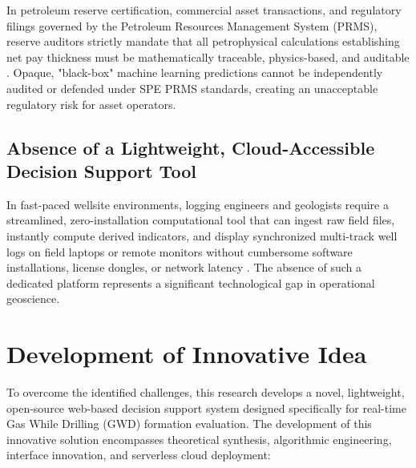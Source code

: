 In petroleum reserve certification, commercial asset transactions, and regulatory filings governed by the \citet{ref3} Petroleum Resources Management System (PRMS), reserve auditors strictly mandate that all petrophysical calculations establishing net pay thickness must be mathematically traceable, physics-based, and auditable \citep{ref2, ref3}. Opaque, "black-box" machine learning predictions cannot be independently audited or defended under SPE PRMS standards, creating an unacceptable regulatory risk for asset operators.

\subsection{Absence of a Lightweight, Cloud-Accessible Decision Support Tool}
In fast-paced wellsite environments, logging engineers and geologists require a streamlined, zero-installation computational tool that can ingest raw field files, instantly compute derived indicators, and display synchronized multi-track well logs on field laptops or remote monitors without cumbersome software installations, license dongles, or network latency \citep{wood2020}. The absence of such a dedicated platform represents a significant technological gap in operational geoscience.

\section{Development of Innovative Idea}

To overcome the identified challenges, this research develops a novel, lightweight, open-source web-based decision support system designed specifically for real-time Gas While Drilling (GWD) formation evaluation. The development of this innovative solution encompasses theoretical synthesis, algorithmic engineering, interface innovation, and serverless cloud deployment:


